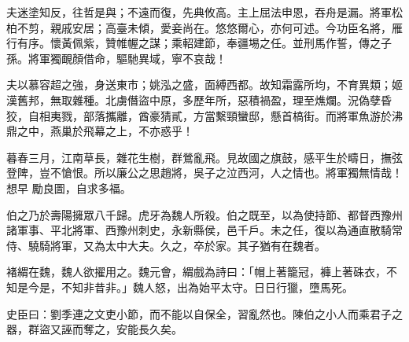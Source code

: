 \begin{pinyinscope}
 夫迷塗知反，往哲是與；不遠而復，先典攸高。主上屈法申恩，吞舟是漏。將軍松柏不剪，親戚安居；高臺未傾，愛妾尚在。悠悠爾心，亦何可述。今功臣名將，雁
 行有序。懷黃佩紫，贊帷幄之謀；乘軺建節，奉疆埸之任。並刑馬作誓，傳之子孫。將軍獨靦顏借命，驅馳異域，寧不哀哉！



 夫以慕容超之強，身送東市；姚泓之盛，面縛西都。故知霜露所均，不育異類；姬漢舊邦，無取雜種。北虜僭盜中原，多歷年所，惡積禍盈，理至燋爛。況偽孽昏狡，自相夷戮，部落攜離，酋豪猜貳，方當繫頸蠻邸，懸首槁街。而將軍魚游於沸鼎之中，燕巢於飛幕之上，不亦惑乎！



 暮春三月，江南草長，雜花生樹，群鶯亂飛。見故國之旗鼓，感平生於疇日，撫弦登陴，豈不愴恨。所以廉公之思趙將，吳子之泣西河，人之情也。將軍獨無情哉！想早
 勵良圖，自求多福。



 伯之乃於壽陽擁眾八千歸。虎牙為魏人所殺。伯之既至，以為使持節、都督西豫州諸軍事、平北將軍、西豫州刺史，永新縣侯，邑千戶。未之任，復以為通直散騎常侍、驍騎將軍，又為太中大夫。久之，卒於家。其子猶有在魏者。



 褚緭在魏，魏人欲擢用之。魏元會，緭戲為詩曰：「帽上著籠冠，褲上著硃衣，不知是今是，不知非昔非。」魏人怒，出為始平太守。日日行獵，墮馬死。



 史臣曰：劉季連之文吏小節，而不能以自保全，習亂然也。陳伯之小人而乘君子之器，群盜又誣而奪之，安能長久矣。



\end{pinyinscope}